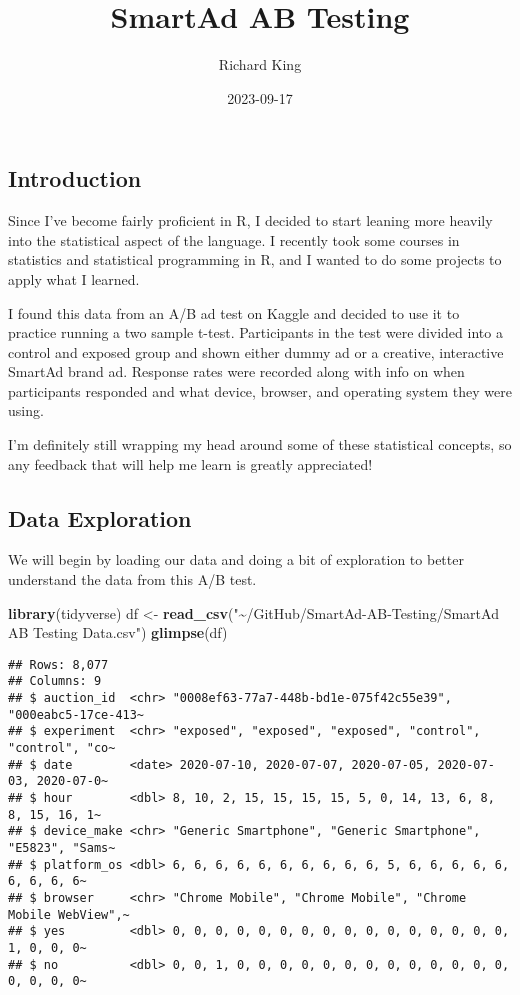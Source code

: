 \documentclass[
]{article}
\title{SmartAd AB Testing}
\author{Richard King}
\date{2023-09-17}
\newenvironment{Shaded}{\begin{snugshade}}{\end{snugshade}}
\newcommand{\FunctionTok}[1]{\textcolor[rgb]{0.13,0.29,0.53}{\textbf{#1}}}
\newcommand{\NormalTok}[1]{#1}
\newcommand{\OtherTok}[1]{\textcolor[rgb]{0.56,0.35,0.01}{#1}}
\newcommand{\StringTok}[1]{\textcolor[rgb]{0.31,0.60,0.02}{#1}}
\begin{document}
\maketitle

\hypertarget{introduction}{%
\subsection{Introduction}\label{introduction}}

Since I've become fairly proficient in R, I decided to start leaning
more heavily into the statistical aspect of the language. I recently
took some courses in statistics and statistical programming in R, and I
wanted to do some projects to apply what I learned.

I found this data from an A/B ad test on Kaggle and decided to use it to
practice running a two sample t-test. Participants in the test were
divided into a control and exposed group and shown either dummy ad or a
creative, interactive SmartAd brand ad. Response rates were recorded
along with info on when participants responded and what device, browser,
and operating system they were using.

I'm definitely still wrapping my head around some of these statistical
concepts, so any feedback that will help me learn is greatly
appreciated!

\hypertarget{data-exploration}{%
\subsection{Data Exploration}\label{data-exploration}}

We will begin by loading our data and doing a bit of exploration to
better understand the data from this A/B test.

\begin{Shaded}
\begin{Highlighting}[]
\FunctionTok{library}\NormalTok{(tidyverse)}
\NormalTok{df }\OtherTok{\textless{}{-}} \FunctionTok{read\_csv}\NormalTok{(}\StringTok{"\textasciitilde{}/GitHub/SmartAd{-}AB{-}Testing/SmartAd AB Testing Data.csv"}\NormalTok{)}
\FunctionTok{glimpse}\NormalTok{(df)}
\end{Highlighting}
\end{Shaded}

\begin{verbatim}
## Rows: 8,077
## Columns: 9
## $ auction_id  <chr> "0008ef63-77a7-448b-bd1e-075f42c55e39", "000eabc5-17ce-413~
## $ experiment  <chr> "exposed", "exposed", "exposed", "control", "control", "co~
## $ date        <date> 2020-07-10, 2020-07-07, 2020-07-05, 2020-07-03, 2020-07-0~
## $ hour        <dbl> 8, 10, 2, 15, 15, 15, 15, 5, 0, 14, 13, 6, 8, 8, 15, 16, 1~
## $ device_make <chr> "Generic Smartphone", "Generic Smartphone", "E5823", "Sams~
## $ platform_os <dbl> 6, 6, 6, 6, 6, 6, 6, 6, 6, 6, 5, 6, 6, 6, 6, 6, 6, 6, 6, 6~
## $ browser     <chr> "Chrome Mobile", "Chrome Mobile", "Chrome Mobile WebView",~
## $ yes         <dbl> 0, 0, 0, 0, 0, 0, 0, 0, 0, 0, 0, 0, 0, 0, 0, 0, 1, 0, 0, 0~
## $ no          <dbl> 0, 0, 1, 0, 0, 0, 0, 0, 0, 0, 0, 0, 0, 0, 0, 0, 0, 0, 0, 0~
\end{verbatim}
\end{document}
